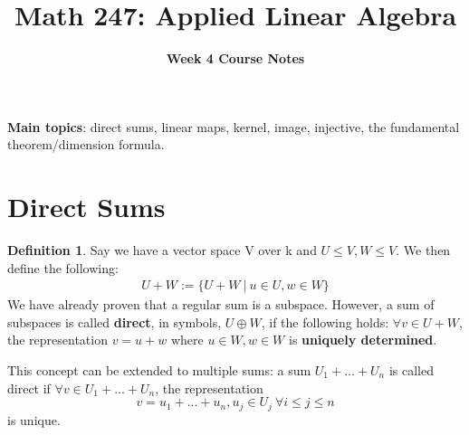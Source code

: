 \documentclass[a4paper, 12pt]{article}
\title{\textbf{Math 247: Applied Linear Algebra } \vspace{-2ex}}
\author{\textbf{Week 4 Course Notes} \vspace{-2ex}}
\date{}
\renewcommand{\arraystretch}{1.0}
\theoremstyle{definition}
\theoremstyle{definition}
\newtheorem{defn}{Definition}[section]
\theoremstyle{definition}
\theoremstyle{definition}
\begin{document}
\maketitle

\pagestyle{fancy}
\rhead{}
\lfoot{}
\cfoot{}
\renewcommand{\headrulewidth}{0.4pt}
\renewcommand{\footrulewidth}{0.4pt}
\setlength{\tabcolsep}{0.5em} %
{\renewcommand{\arraystretch}{1.2}%

\textbf{Main topics}: direct sums, linear maps, kernel, image, injective, the fundamental theorem/dimension formula. 
\section{Direct Sums}
\begin{defn}
	Say we have a vector space V over k and $U \leq V, W \leq V$. We then define the following: 
	\begin{align*}
		U + W := \{ U + W\ |\ u \in U, w \in W \}
	\end{align*}
	We have already proven that a regular sum is a subspace. However, a sum of subspaces is called \textbf{direct}, in symbols, $U \oplus W$, if the following holds: $\forall v \in U + W$, the representation $v = u + w$ where $u \in W, w \in W$ is \textbf{uniquely determined}. 
\end{defn}
This concept can be extended to multiple sums: a sum $U_1 + ... + U_n$ is called direct if $\forall v \in U_1 + ... + U_n$, the representation $$ v = u_1 + ... + u_n, u_j \in U_j\ \forall i \leq j \leq n$$ is unique. 


}
\end{document}

